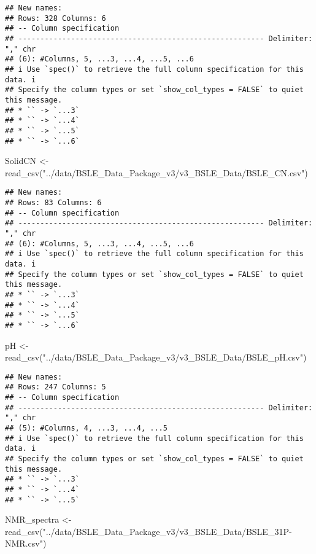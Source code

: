 \documentclass[
]{article}
\newenvironment{Shaded}{\begin{snugshade}}{\end{snugshade}}
\newcommand{\FunctionTok}[1]{\textcolor[rgb]{0.00,0.00,0.00}{#1}}
\newcommand{\NormalTok}[1]{#1}
\newcommand{\OtherTok}[1]{\textcolor[rgb]{0.56,0.35,0.01}{#1}}
\newcommand{\StringTok}[1]{\textcolor[rgb]{0.31,0.60,0.02}{#1}}
\begin{document}
\begin{verbatim}
## New names:
## Rows: 328 Columns: 6
## -- Column specification
## -------------------------------------------------------- Delimiter: "," chr
## (6): #Columns, 5, ...3, ...4, ...5, ...6
## i Use `spec()` to retrieve the full column specification for this data. i
## Specify the column types or set `show_col_types = FALSE` to quiet this message.
## * `` -> `...3`
## * `` -> `...4`
## * `` -> `...5`
## * `` -> `...6`
\end{verbatim}

\begin{Shaded}
\begin{Highlighting}[]
\NormalTok{SolidCN }\OtherTok{\textless{}{-}} \FunctionTok{read\_csv}\NormalTok{(}\StringTok{"../data/BSLE\_Data\_Package\_v3/v3\_BSLE\_Data/BSLE\_CN.csv"}\NormalTok{)}
\end{Highlighting}
\end{Shaded}

\begin{verbatim}
## New names:
## Rows: 83 Columns: 6
## -- Column specification
## -------------------------------------------------------- Delimiter: "," chr
## (6): #Columns, 5, ...3, ...4, ...5, ...6
## i Use `spec()` to retrieve the full column specification for this data. i
## Specify the column types or set `show_col_types = FALSE` to quiet this message.
## * `` -> `...3`
## * `` -> `...4`
## * `` -> `...5`
## * `` -> `...6`
\end{verbatim}

\begin{Shaded}
\begin{Highlighting}[]
\NormalTok{pH }\OtherTok{\textless{}{-}} \FunctionTok{read\_csv}\NormalTok{(}\StringTok{"../data/BSLE\_Data\_Package\_v3/v3\_BSLE\_Data/BSLE\_pH.csv"}\NormalTok{)}
\end{Highlighting}
\end{Shaded}

\begin{verbatim}
## New names:
## Rows: 247 Columns: 5
## -- Column specification
## -------------------------------------------------------- Delimiter: "," chr
## (5): #Columns, 4, ...3, ...4, ...5
## i Use `spec()` to retrieve the full column specification for this data. i
## Specify the column types or set `show_col_types = FALSE` to quiet this message.
## * `` -> `...3`
## * `` -> `...4`
## * `` -> `...5`
\end{verbatim}

\begin{Shaded}
\begin{Highlighting}[]
\NormalTok{NMR\_spectra }\OtherTok{\textless{}{-}} \FunctionTok{read\_csv}\NormalTok{(}\StringTok{"../data/BSLE\_Data\_Package\_v3/v3\_BSLE\_Data/BSLE\_31P{-}NMR.csv"}\NormalTok{)}
\end{Highlighting}
\end{Shaded}
\end{document}
